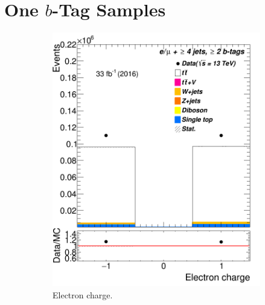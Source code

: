 
\section{One $b$-Tag Samples}

	



\begin{figure} %
	\centering	
	\begin{subfigure}{0.25\textwidth}
		\includegraphics[width=\linewidth]{ControlPlots_emujets_2016_4incl_2incl/el_charge_emujets_2016.png}
		\caption{Electron charge.} \label{fig:a1}
	\end{subfigure}\hspace*{1.0cm}
	\begin{subfigure}{0.25\textwidth}

\end{subfigure}
\end{figure}
